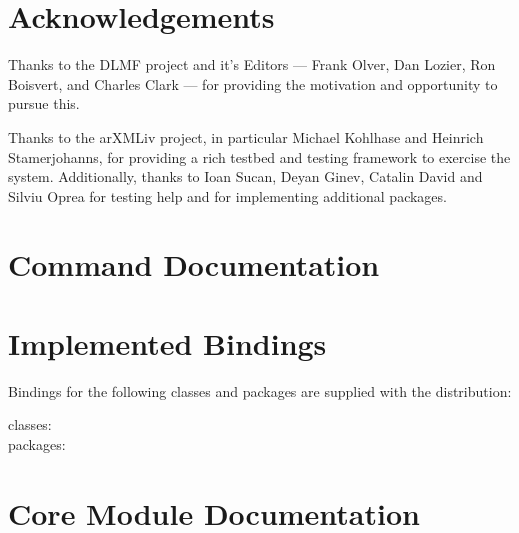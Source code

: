 \documentclass{book}
\begin{document}
\chapter*{Acknowledgements}\label{acknowledgements}
Thanks to the DLMF project and it's Editors ---
Frank Olver, Dan Lozier, Ron Boisvert, and Charles Clark ---
for providing the motivation and opportunity to pursue this.

Thanks to the arXMLiv project, in particular Michael Kohlhase and Heinrich Stamerjohanns,
for providing a rich testbed and testing framework to exercise the system.
Additionally, thanks to Ioan Sucan, Deyan Ginev,
Catalin David and Silviu Oprea for testing help and for implementing additional packages.

\appendix
\chapter[Commands]{Command Documentation}\label{commands}





\chapter[Bindings]{Implemented Bindings}\label{included.bindings}
Bindings for the following classes and packages are supplied with the distribution:
\begin{description}
\item[classes:] \CurrentClasses
\item[packages:] \CurrentPackages
\end{description}

\chapter[Modules]{Core Module Documentation}\label{coremodules}









\end{document}
